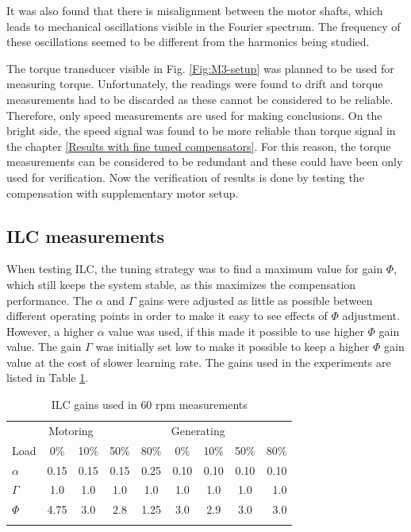 It was also found that there is misalignment between the motor shafts, which leads to mechanical oscillations visible in the Fourier spectrum. The frequency of these oscillations seemed to be different from the harmonics being studied.

The torque transducer visible in Fig. \ref{Fig:M3-setup} was planned to be used for measuring torque. Unfortunately, the readings were found to drift and torque measurements had to be discarded as these cannot be considered to be reliable. Therefore, only speed measurements are used for making conclusions. On the bright side, the speed signal was found to be more reliable than torque signal in the chapter \ref{Results with fine tuned compensators}. For this reason, the torque measurements can be considered to be redundant and these could have been only used for verification. Now the verification of results is done by testing the compensation with supplementary motor setup.


\subsection{ILC measurements}
When testing ILC, the tuning strategy was to find a maximum value for gain $\Phi$, which still keeps the system stable, as this maximizes the compensation performance. The $\alpha$ and $\Gamma$ gains were adjusted as little as possible between different operating points in order to make it easy to see effects of $\Phi$ adjustment. However, a higher $\alpha$ value was used, if this made it possible to use higher $\Phi$ gain value. The gain $\Gamma$ was initially set low to make it possible to keep a higher $\Phi$ gain value at the cost of slower learning rate. The gains used in the experiments are listed in Table \ref{tab:60rpm}.
\begin{table}[htb]
\caption{ILC gains used in $60$ rpm measurements}
\centering
\begin{tabular}{lcccccccr}
\toprule
\multicolumn{4}{c}{Motoring} & \multicolumn{4}{c}{Generating}\\
\cmidrule(r){2-5} \cmidrule(r){6-9}
Load         & 0\% & 10\% & 50\% & 80\%   & 0\%    & 10\% & 50\% & 80\% \\
\midrule
$\alpha$     & 0.15 & 0.15 & 0.15 & 0.25   & 0.10  & 0.10 & 0.10 & 0.10 \\
$\Gamma$     & 1.0  & 1.0  & 1.0  & 1.0    & 1.0   & 1.0  & 1.0  & 1.0 \\
$\Phi$       & 4.75 & 3.0  & 2.8  & 1.25   & 3.0   & 2.9  & 3.0  & 3.0 \\
\bottomrule
\label{tab:60rpm}
\end{tabular}
\end{table}


